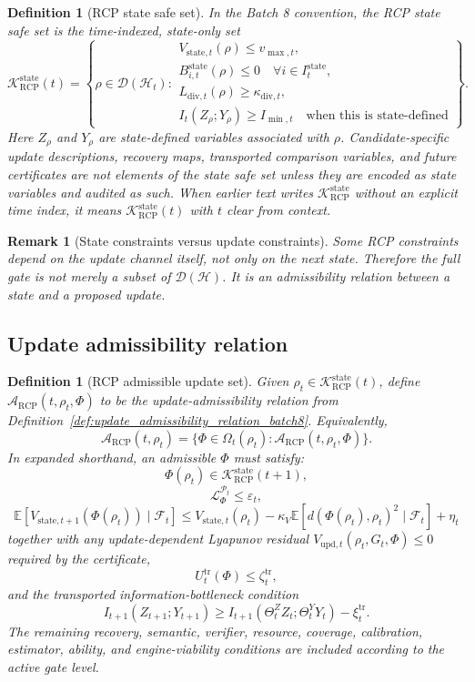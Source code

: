 \documentclass[11pt]{article}
\newtheorem{definition}[theorem]{Definition}
\newtheorem{remark}[theorem]{Remark}
\newcommand{\D}{\mathcal{D}}
\newcommand{\Hcal}{\mathcal{H}}
\newcommand{\K}{\mathcal{K}}
\newcommand{\Acal}{\mathcal{A}}
\newcommand{\Pcal}{\mathcal{P}}
\newcommand{\Fcal}{\mathcal{F}}
\newcommand{\Lcal}{\mathcal{L}}
\newcommand{\1}{\mathbf{1}}
\newcommand{\eps}{\varepsilon}
\newcommand{\RCP}{\mathrm{RCP}}
\newcommand{\diver}{\mathrm{div}}
\newcommand{\state}{\mathrm{state}}
\providecommand{\upd}{\mathrm{upd}}
\begin{document}
\begin{definition}[RCP state safe set]
In the Batch 8 convention, the RCP state safe set is the time-indexed, state-only set
\[
\K_{\RCP}^{\state}(t)
=
\left\{
\rho\in\D(\Hcal_t):
\begin{array}{l}
V_{\state,t}(\rho)\le v_{\max,t},\\
B_{i,t}^{\state}(\rho)\le0\quad\forall i\in I_t^{\state},\\
L_{\diver,t}(\rho)\ge\kappa_{\diver,t},\\
I_t(Z_\rho;Y_\rho)\ge I_{\min,t}\quad\text{when this is state-defined}
\end{array}
\right\}.
\]
Here \(Z_\rho\) and \(Y_\rho\) are state-defined variables associated with \(\rho\). Candidate-specific update descriptions, recovery maps, transported comparison variables, and future certificates are not elements of the state safe set unless they are encoded as state variables and audited as such. When earlier text writes \(\K_{\RCP}^{\state}\) without an explicit time index, it means \(\K_{\RCP}^{\state}(t)\) with \(t\) clear from context.
\end{definition}

\begin{remark}[State constraints versus update constraints]
Some RCP constraints depend on the update channel itself, not only on the next state. Therefore the full gate is not merely a subset of \(\D(\Hcal)\). It is an admissibility relation between a state and a proposed update.
\end{remark}

\subsection{Update admissibility relation}

\begin{definition}[RCP admissible update set]
Given \(\rho_t\in\K_{\RCP}^{\state}(t)\), define \(\Acal_{\RCP}(t,\rho_t,\Phi)\) to be the update-admissibility relation from Definition~\ref{def:update_admissibility_relation_batch8}. Equivalently,
\[
\Acal_{\RCP}(t,\rho_t)
=
\{\Phi\in\Omega_t(\rho_t):\Acal_{\RCP}(t,\rho_t,\Phi)\}.
\]
In expanded shorthand, an admissible \(\Phi\) must satisfy:
\[
\Phi(\rho_t)\in\K_{\RCP}^{\state}(t+1),
\]
\[
\Lcal_{\Phi}^{\Pcal_t}\le\eps_t,
\]
\[
\mathbb E[V_{\state,t+1}(\Phi(\rho_t))\mid\Fcal_t]
\le
V_{\state,t}(\rho_t)
-
\kappa_V\mathbb E[d(\Phi(\rho_t),\rho_t)^2\mid\Fcal_t]
+
\eta_t
\]
together with any update-dependent Lyapunov residual \(V_{\upd,t}(\rho_t,G_t,\Phi)\le0\) required by the certificate,
\[
U_t^{\mathrm{tr}}(\Phi)\le\zeta_t^{\mathrm{tr}},
\]
and the transported information-bottleneck condition
\[
I_{t+1}(Z_{t+1};Y_{t+1})
\ge
I_{t+1}(\Theta_t^Z Z_t;\Theta_t^Y Y_t)-\xi_t^{\mathrm{tr}}.
\]
The remaining recovery, semantic, verifier, resource, coverage, calibration, estimator, ability, and engine-viability conditions are included according to the active gate level.
\end{definition}
\end{document}
